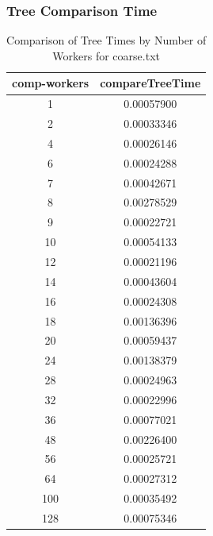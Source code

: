 \documentclass[letterpaper,12pt]{article}
\theoremstyle{remark}
\begin{document}
\clearpage

\subsubsection{Tree Comparison Time}

\begin{table}[h]
\centering
\begin{tabular}{|c|c|}
\hline
\textbf{comp-workers} & \textbf{compareTreeTime} \\ \hline
1   & 0.00057900 \\ \hline
2   & 0.00033346 \\ \hline
4   & 0.00026146 \\ \hline
6   & 0.00024288 \\ \hline
7   & 0.00042671 \\ \hline
8   & 0.00278529 \\ \hline
9   & 0.00022721 \\ \hline
10  & 0.00054133 \\ \hline
12  & 0.00021196 \\ \hline
14  & 0.00043604 \\ \hline
16  & 0.00024308 \\ \hline
18  & 0.00136396 \\ \hline
20  & 0.00059437 \\ \hline
24  & 0.00138379 \\ \hline
28  & 0.00024963 \\ \hline
32  & 0.00022996 \\ \hline
36  & 0.00077021 \\ \hline
48  & 0.00226400 \\ \hline
56  & 0.00025721 \\ \hline
64  & 0.00027312 \\ \hline
100 & 0.00035492 \\ \hline
128 & 0.00075346 \\ \hline
\end{tabular}
\caption{Comparison of Tree Times by Number of Workers for coarse.txt}
\label{table:comp_tree_times}
\end{table}
\end{document}
